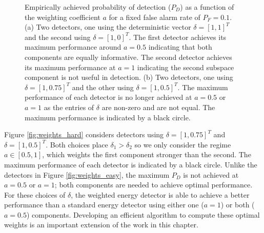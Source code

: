 \begin{figure}[t]
\centering
{}
\caption{Empirically achieved probability of detection ($P_D$) as a function of the
  weighting coefficient $a$ for a fixed false alarm rate of $P_F=0.1$. (a) Two detectors,
  one using the deterministic vector $\delta=[1,1]^T$ and the second using
  $\delta=[1,0]^T$.  The first detector achieves its maximum performance around $a=0.5$
  indicating that both components are equally informative. The second detector achieves
  its maximum performance at $a=1$ indicating the second subspace component is not useful
  in detection. (b) Two detectors, one using $\delta=[1, 0.75]^T$ and the other using
  $\delta=[1, 0.5]^T$. The maximum performance of each detector is no longer achieved at
  $a=0.5$ or $a=1$ as the entries of $\delta$ are non-zero and are not equal. The maximum
  performance is indicated by a black circle.}
\label{fig:weighted}
\end{figure}


Figure \ref{fig:weights_hard} considers detectors using $\delta=[1, 0.75]^T$ and $\delta=[1,
0.5]^T$. Both choices place $\delta_1>\delta_2$ so we only consider the regime $a\in[0.5,
1]$, which weights the first component stronger than the second. The maximum performance
of each detector is indicated by a black circle. Unlike the detectors in Figure
\ref{fig:weights_easy}, the maximum $P_D$ is not achieved at $a=0.5$ or $a=1$; both
components are needed to achieve optimal performance. For these choices of $\delta$, the
weighted energy detector is able to achieve a better performance than a standard energy
detector using either one ($a=1$) or both ($a=0.5$) components. Developing an efficient algorithm
to compute these optimal weights is an important extension of the work in this chapter.

